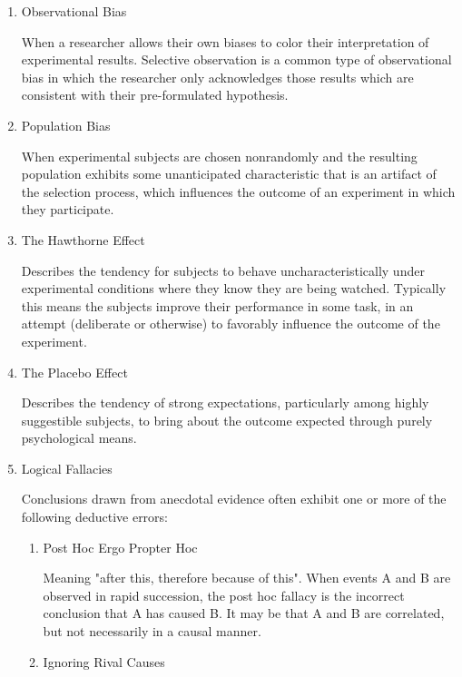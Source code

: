 \documentclass{article}
\begin{document}
\begin{enumerate}
\item Observational Bias
\label{sec:orgheadline366}

When a researcher allows their own biases to color their interpretation
of experimental results. Selective observation is a common type of
observational bias in which the researcher only acknowledges those
results which are consistent with their pre-formulated hypothesis.

\item Population Bias
\label{sec:orgheadline367}

When experimental subjects are chosen nonrandomly and the resulting
population exhibits some unanticipated characteristic that is an
artifact of the selection process, which influences the outcome of an
experiment in which they participate.

\item The Hawthorne Effect
\label{sec:orgheadline368}

Describes the tendency for subjects to behave uncharacteristically under
experimental conditions where they know they are being watched.
Typically this means the subjects improve their performance in some
task, in an attempt (deliberate or otherwise) to favorably influence the
outcome of the experiment.

\item The Placebo Effect
\label{sec:orgheadline369}

Describes the tendency of strong expectations, particularly among highly
suggestible subjects, to bring about the outcome expected through purely
psychological means.

\item Logical Fallacies
\label{sec:orgheadline373}

Conclusions drawn from anecdotal evidence often exhibit one or more of
the following deductive errors:

\begin{enumerate}
\item Post Hoc Ergo Propter Hoc
\label{sec:orgheadline370}

Meaning "after this, therefore because of this". When events A and B are
observed in rapid succession, the post hoc fallacy is the incorrect
conclusion that A has caused B. It may be that A and B are correlated,
but not necessarily in a causal manner.

\item Ignoring Rival Causes
\label{sec:orgheadline371}


\end{enumerate}
\end{enumerate}
\end{document}
